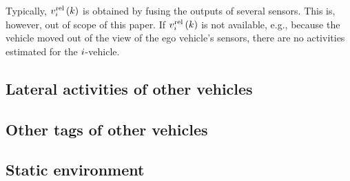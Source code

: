 \cstarta
\begin{remark}
	Typically, $v_{i}^{\mathrm{rel}}\left(k\right)$ is obtained by fusing the outputs of several sensors. This is, however, out of scope of this paper. If $v_{i}^{\mathrm{rel}}\left(k\right)$ is not available, e.g., because the vehicle moved out of the view of the ego vehicle's sensors, there are no activities estimated for the $i$-vehicle.
\end{remark}
\cenda




\subsection{Lateral activities of other vehicles}
\label{sec:lateral other vehicles}




\subsection{Other tags of other vehicles}
\label{sec:other tags other vehicles}




\subsection{Static environment}
\label{sec:static environment}

